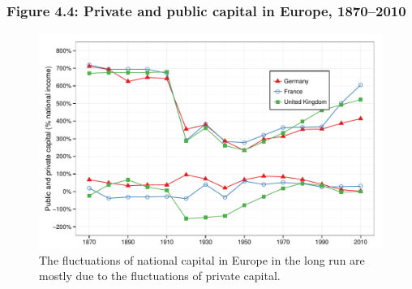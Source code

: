 \documentclass[t]{beamer}\usepackage[]{graphicx}\usepackage[]{color}
\newenvironment{knitrout}{}{} %
\begin{document}
\begin{frame}[label=Figure_4_4]
\frametitle{Figure 4.4: Private and public capital in Europe, 1870--2010}
\begin{figure}[t]
\begin{minipage}[b]{\textwidth}
\centering
\begin{knitrout}\footnotesize
{}\color{fgcolor}

{\centering \includegraphics[width=1\linewidth]{figures/color/Figure_4_4} 

}



\end{knitrout}
\caption{The fluctuations of national capital in Europe in the long run are mostly due to the fluctuations of private capital.}
\end{minipage}
\end{figure}
\end{frame}
\end{document}
